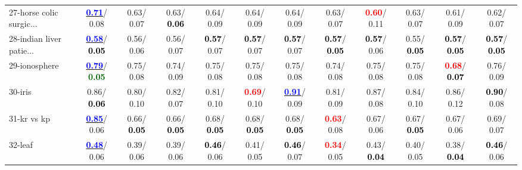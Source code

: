 \begin{table}[h]
\begin{center}
{\begin{tabular}{lc|c|c|c|c|c|c|c|c|c|c}
27-horse colic surgic... & \underline{\textcolor{blue}{\textbf{  0.71}}}/  0.08 &   0.63/  0.07 &   0.63/\textcolor{black}{\textbf{  0.06}} &   0.64/  0.09 &   0.64/  0.09 &   0.64/  0.09 &   0.63/  0.07 & \textcolor{red}{\textbf{  0.60}}/  0.11 &   0.63/  0.07 &   0.61/  0.09 &   0.62/  0.07 \\
28-indian liver patie... & \underline{\textcolor{blue}{\textbf{  0.58}}}/\textcolor{black}{\textbf{  0.05}} &   0.56/  0.06 &   0.56/  0.07 & \textcolor{black}{\textbf{  0.57}}/  0.07 & \textcolor{black}{\textbf{  0.57}}/  0.07 & \textcolor{black}{\textbf{  0.57}}/  0.07 & \textcolor{black}{\textbf{  0.57}}/\textcolor{black}{\textbf{  0.05}} & \textcolor{black}{\textbf{  0.57}}/  0.06 &   0.55/\textcolor{black}{\textbf{  0.05}} & \textcolor{black}{\textbf{  0.57}}/\textcolor{black}{\textbf{  0.05}} & \textcolor{black}{\textbf{  0.57}}/\textcolor{black}{\textbf{  0.05}} \\ \hline
29-ionosphere & \underline{\textcolor{blue}{\textbf{  0.79}}}/\textcolor{darkgreen}{\textbf{  0.05}} &   0.75/  0.08 &   0.74/  0.09 &   0.75/  0.08 &   0.75/  0.08 &   0.75/  0.08 &   0.74/  0.08 &   0.75/  0.08 &   0.75/  0.08 & \textcolor{red}{\textbf{  0.68}}/\textcolor{black}{\textbf{  0.07}} &   0.76/  0.09 \\
30-iris &   0.86/\textcolor{black}{\textbf{  0.06}} &   0.80/  0.10 &   0.82/  0.07 &   0.81/  0.10 & \textcolor{red}{\textbf{  0.69}}/  0.10 & \underline{\textcolor{blue}{\textbf{  0.91}}}/  0.09 &   0.81/  0.09 &   0.87/  0.08 &   0.84/  0.10 &   0.86/  0.12 & \textcolor{black}{\textbf{  0.90}}/  0.08 \\
31-kr vs kp & \underline{\textcolor{blue}{\textbf{  0.85}}}/  0.06 &   0.66/\textcolor{black}{\textbf{  0.05}} &   0.66/\textcolor{black}{\textbf{  0.05}} &   0.68/\textcolor{black}{\textbf{  0.05}} &   0.68/\textcolor{black}{\textbf{  0.05}} &   0.68/\textcolor{black}{\textbf{  0.05}} & \textcolor{red}{\textbf{  0.63}}/  0.08 &   0.67/  0.06 &   0.67/\textcolor{black}{\textbf{  0.05}} &   0.67/  0.06 &   0.69/  0.07 \\
32-leaf & \underline{\textcolor{blue}{\textbf{  0.48}}}/  0.06 &   0.39/  0.06 &   0.39/  0.06 & \textcolor{black}{\textbf{  0.46}}/  0.06 &   0.41/  0.05 & \textcolor{black}{\textbf{  0.46}}/  0.07 & \textcolor{red}{\textbf{  0.34}}/  0.05 &   0.43/\textcolor{black}{\textbf{  0.04}} &   0.40/  0.05 &   0.38/\textcolor{black}{\textbf{  0.04}} & \textcolor{black}{\textbf{  0.46}}/  0.06 \\\end{tabular}}\label{stratsBalAcc0aIELM}
\end{center}
\end{table}
